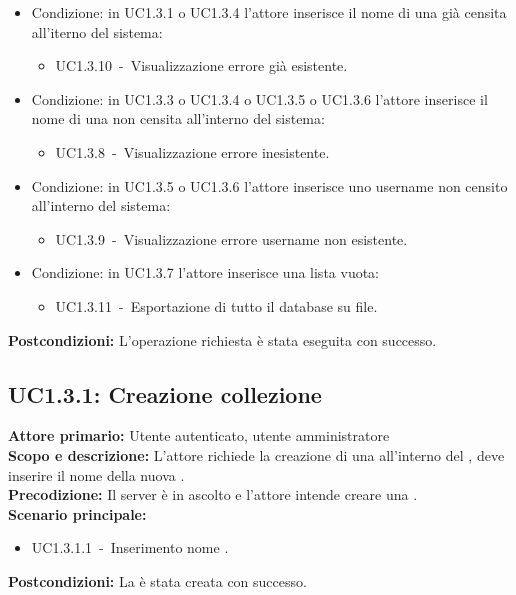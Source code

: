 \documentclass{scalatekids-article}
\begin{document}
\begin{itemize}
\item Condizione: in UC1.3.1 o UC1.3.4 l'attore inserisce il nome di una  già censita all'iterno del sistema:
  \begin{itemize}
  \item UC1.3.10\ -\ Visualizzazione errore  già esistente.
  \end{itemize}
\item Condizione: in UC1.3.3 o UC1.3.4 o UC1.3.5 o UC1.3.6 l'attore inserisce il nome di una  non censita all'interno del sistema:
  \begin{itemize}
  \item UC1.3.8\ -\ Visualizzazione errore  inesistente.
  \end{itemize}
\item Condizione: in UC1.3.5 o UC1.3.6 l'attore inserisce uno username non censito all'interno del sistema:
  \begin{itemize}
  \item UC1.3.9\ -\ Visualizzazione errore username non esistente.
  \end{itemize}
\item Condizione: in UC1.3.7 l'attore inserisce una lista  vuota:
  \begin{itemize}
  \item UC1.3.11\ -\ Esportazione di tutto il database su file.
  \end{itemize}
\end{itemize}
\textbf{Postcondizioni:} L'operazione richiesta è stata eseguita con successo.

\subsection{UC1.3.1: Creazione collezione}

\textbf{Attore primario:} Utente autenticato, utente amministratore\\
\textbf{Scopo e descrizione:} L'attore richiede la creazione di una  all'interno del , deve inserire il nome della nuova .\\
\textbf{Precodizione:} Il server è in ascolto e l'attore intende creare una .\\
\textbf{Scenario principale:}
\begin{itemize}
\item UC1.3.1.1\ -\ Inserimento nome . %
\end{itemize}
\textbf{Postcondizioni:} La  è stata creata con successo.
\end{document}
